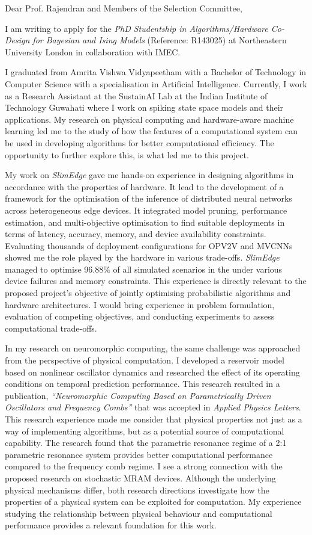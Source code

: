 Dear Prof. Rajendran and Members of the Selection Committee,

I am writing to apply for the \textit{PhD Studentship in Algorithms/Hardware Co-Design for Bayesian and Ising Models} (Reference: R143025) at Northeastern University London in collaboration with IMEC.

I graduated from Amrita Vishwa Vidyapeetham with a Bachelor of Technology in Computer Science with a specialisation in Artificial Intelligence. Currently, I work as a Research Assistant at the SustainAI Lab at the Indian Institute of Technology Guwahati where I work on  spiking state space models and their applications. My research on physical computing and hardware-aware machine learning led me to the study of how the features of a computational system can be used in developing algorithms for better computational efficiency. The opportunity to further explore this, is what led me to this project.

My work on \textit{SlimEdge} gave me hands-on experience in designing algorithms in accordance with the properties of hardware. It lead to the  development of a framework for the optimisation of the inference of distributed neural networks across heterogeneous edge devices. It integrated model pruning, performance estimation, and multi-objective optimisation to find suitable deployments in terms of latency, accuracy, memory, and device availability constraints. Evaluating thousands of deployment configurations for OPV2V and MVCNNs showed me the role played by the hardware in various trade-offs. \textit{SlimEdge} managed to optimise 96.88\% of all simulated scenarios in the under various device failures and memory constraints. This experience is directly relevant to the proposed project’s objective of jointly optimising probabilistic algorithms and hardware architectures. I would bring experience in problem formulation, evaluation of competing objectives, and conducting experiments to assess computational trade-offs.

In my research on neuromorphic computing, the same challenge was approached from the perspective of physical computation. I developed a reservoir model based on nonlinear oscillator dynamics and researched the effect of its operating conditions on temporal prediction performance. This research resulted in a publication, \textit{``Neuromorphic Computing Based on Parametrically Driven Oscillators and Frequency Combs''} that was accepted in \textit{Applied Physics Letters}. This research experience made me consider that physical properties not just as a way of implementing algorithms, but as a potential source of computational capability. The research found that the parametric resonance regime of a 2:1 parametric resonance system provides better computational performance compared to the frequency comb regime. I see a strong connection with the proposed research on stochastic MRAM devices. Although the underlying physical mechanisms differ, both research directions investigate how the properties of a physical system can be exploited for computation. My experience studying the relationship between physical behaviour and computational performance provides a relevant foundation for this work.

